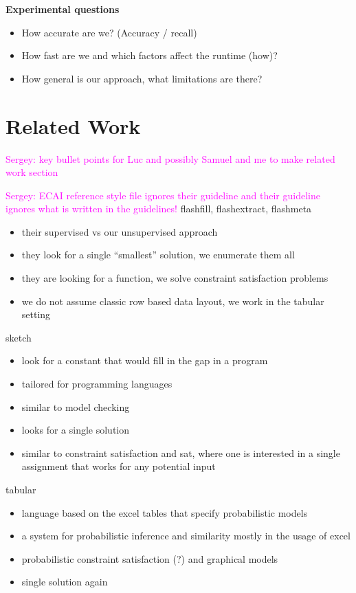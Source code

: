 \documentclass{ecai}
\newcommand{\sergey}[1]{\textcolor{magenta}{{\sc Sergey:} #1}\xspace}
\begin{document}
{\bfseries 
  Experimental questions
}
\begin{itemize}
  \item  How accurate are we? (Accuracy / recall)
  \item  How fast are we and which factors affect the runtime (how)?
  \item  How general is our approach, what limitations are there?
\end{itemize}


\section{Related Work}
\sergey{key bullet points for Luc and possibly Samuel and me to make related work section}

\sergey{ECAI reference style file ignores their guideline and their guideline ignores what is written in the guidelines!}
flashfill, flashextract, flashmeta \cite{flashfill,flashextract,flashmeta}
\begin{itemize}
  \item their supervised vs our unsupervised approach
  \item they look for a single ``smallest'' solution, we enumerate them all
  \item they are looking for a function, we solve constraint satisfaction problems
  \item we do not assume classic row based data layout, we work in the tabular setting
\end{itemize}

sketch \cite{sketch}
\begin{itemize}
  \item look for a constant that would fill in the gap in a program
  \item tailored for programming languages
  \item similar to model checking
  \item looks for a single solution
  \item similar to constraint satisfaction and sat, where one is interested in a single assignment that works for any potential input
\end{itemize}

tabular \cite{tabular}
\begin{itemize}
  \item language based on the excel tables that specify probabilistic models
  \item a system for probabilistic inference and similarity mostly in the usage of excel
  \item probabilistic constraint satisfaction (?) and graphical models
  \item single solution again
\end{itemize}
\end{document}
